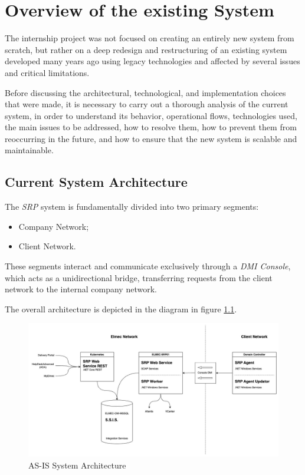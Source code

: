 \chapter{Overview of the existing System}
The internship project was not focused on creating an entirely new system from scratch, but rather on a deep redesign and restructuring of an existing system developed many years ago using legacy technologies and affected by several issues and critical limitations.

Before discussing the architectural, technological, and implementation choices that were made, it is necessary to carry out a thorough analysis of the current system, in order to understand its behavior, operational flows, technologies used, the main issues to be addressed, how to resolve them, how to prevent them from reoccurring in the future, and how to ensure that the new system is scalable and maintainable.

\section{Current System Architecture}

The \textit{SRP} system is fundamentally divided into two primary segments: 
\begin{itemize}
    \item Company Network;
    \item Client Network.
\end{itemize}

These segments interact and communicate exclusively through a \textit{DMI Console}, which acts as a unidirectional bridge, transferring requests from the client network to the internal company network. 

The overall architecture is depicted in the diagram in figure \ref{fig:as-is-system-design}.

\begin{figure}[h]
  \centering
  \includegraphics[width=1.0\textwidth]{images/as-is/SRP AS-IS (System Architecture).jpg}
  \caption{AS-IS System Architecture}
  \label{fig:as-is-system-design}
\end{figure}

